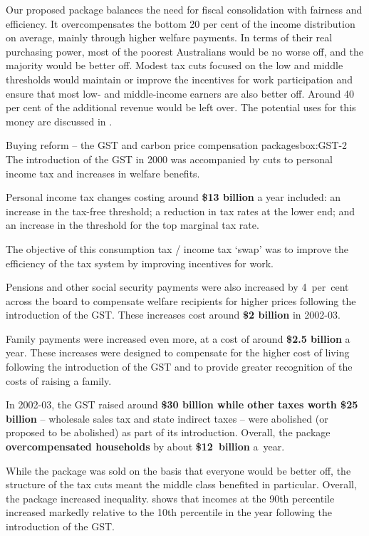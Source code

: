 Our proposed package balances the need for fiscal consolidation with fairness and efficiency. It overcompensates the bottom 20 per cent of the income distribution on average, mainly through higher welfare payments. In terms of their real purchasing power, most of the poorest Australians would be no worse off, and the majority would be better off. Modest tax cuts focused on the low and middle thresholds would maintain or improve the incentives for work participation and ensure that most low- and middle-income earners are also better off. Around 40 per cent of the additional revenue would be left over. The potential uses for this money are discussed in . 

\begin{bigboxC*}{Buying reform -- the GST and carbon price compensation packages}{box:GST-2}
The introduction of the GST in 2000 was accompanied by cuts to personal income tax and increases in welfare benefits.

Personal income tax changes costing around \textbf{\$13 billion} a year included: an increase in the tax-free threshold; a reduction in tax rates at the lower end; and an increase in the threshold for the top marginal tax rate. 

The objective of this consumption tax / income tax ‘swap’ was to improve the efficiency of the tax system by improving incentives for work.

Pensions and other social security payments were also increased by 4~per~cent across the board to compensate welfare recipients for higher prices following the introduction of the GST. These increases cost around \textbf{\$2 billion} in 2002-03. 

Family payments were increased even more, at a cost of around \textbf{\$2.5 billion} a year. These increases were designed to compensate for the higher cost of living following the introduction of the GST and to provide greater recognition of the costs of raising a family. 

In 2002-03, the GST raised around \textbf{\$30 billion while other taxes worth \$25 billion} – wholesale sales tax and state indirect taxes – were abolished (or proposed to be abolished) as part of its introduction. Overall, the package \textbf{overcompensated households} by about \textbf{\$12~billion} a~year.

While the package was sold on the basis that everyone would be better off, the structure of the tax cuts meant the middle class benefited in particular. Overall, the package increased inequality. \textcite{Saunders2004} shows that incomes at the 90th percentile increased markedly relative to the 10th percentile in the year following the introduction of the GST.


\end{bigboxC*}
